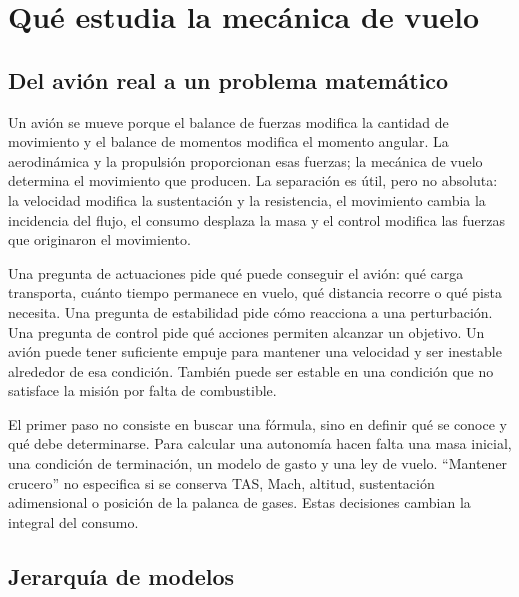 \chapter{Qué estudia la mecánica de vuelo}\label{ch:intro}

\section{Del avión real a un problema matemático}
Un avión se mueve porque el balance de fuerzas modifica la cantidad de movimiento y el balance de momentos modifica el momento angular. La aerodinámica y la propulsión proporcionan esas fuerzas; la mecánica de vuelo determina el movimiento que producen. La separación es útil, pero no absoluta: la velocidad modifica la sustentación y la resistencia, el movimiento cambia la incidencia del flujo, el consumo desplaza la masa y el control modifica las fuerzas que originaron el movimiento.

Una pregunta de actuaciones pide qué puede conseguir el avión: qué carga transporta, cuánto tiempo permanece en vuelo, qué distancia recorre o qué pista necesita. Una pregunta de estabilidad pide cómo reacciona a una perturbación. Una pregunta de control pide qué acciones permiten alcanzar un objetivo. Un avión puede tener suficiente empuje para mantener una velocidad y ser inestable alrededor de esa condición. También puede ser estable en una condición que no satisface la misión por falta de combustible.

El primer paso no consiste en buscar una fórmula, sino en definir qué se conoce y qué debe determinarse. Para calcular una autonomía hacen falta una masa inicial, una condición de terminación, un modelo de gasto y una ley de vuelo. ``Mantener crucero'' no especifica si se conserva TAS, Mach, altitud, sustentación adimensional o posición de la palanca de gases. Estas decisiones cambian la integral del consumo.

\section{Jerarquía de modelos}
